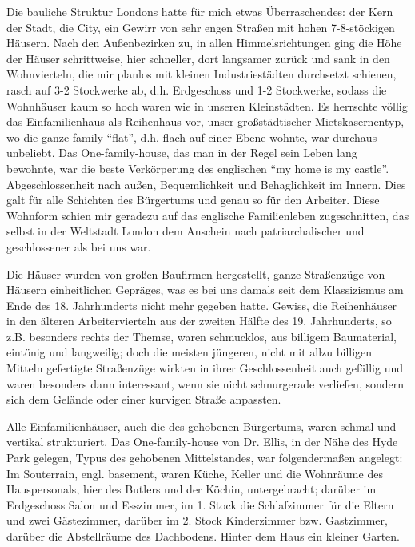 \documentclass[a5paper,pagesize,10pt,twoside=true]{scrbook}
\renewcommand{\marginpar}[2][]{}
\begin{document}
Die bauliche Struktur Londons hatte für mich etwas Überraschendes: der Kern der Stadt, die City, ein Gewirr von sehr engen Straßen mit hohen 7-8-stöckigen Häusern. Nach den Außenbezirken zu, in allen Himmelsrichtungen ging die Höhe der Häuser schrittweise, hier schneller, dort langsamer zurück und sank in den Wohnvierteln, die mir planlos mit kleinen Industriestädten durchsetzt schienen, rasch auf 3-2 Stockwerke ab, d.h. Erdgeschoss und 1-2 Stockwerke, sodass die Wohnhäuser kaum so hoch waren wie in unseren Kleinstädten. Es herrschte völlig das Einfamilienhaus als Reihenhaus vor, unser großstädtischer Mietskasernentyp, wo die ganze family \enquote{flat}, d.h. flach auf einer Ebene wohnte, war durchaus unbeliebt. Das One-family-house, das man in der Regel sein Leben lang bewohnte, war die beste Verkörperung des englischen \enquote{my home is my castle}. Abgeschlossenheit nach außen, Bequemlichkeit und Behaglichkeit im Innern. Dies galt für alle Schichten des Bürgertums und genau so für den Arbeiter. Diese Wohnform schien mir geradezu auf das englische Familienleben zugeschnitten, das selbst in der Weltstadt London dem Anschein nach patriarchalischer und geschlossener als bei uns war.

Die Häuser wurden von großen Baufirmen hergestellt, ganze Straßenzüge von Häusern einheitlichen Gepräges, was es bei uns damals seit dem Klassizismus am Ende des 18. Jahrhunderts nicht mehr gegeben hatte. Gewiss, die Reihenhäuser in den älteren Arbeitervierteln aus der zweiten Hälfte des 19. Jahrhunderts, so z.B. besonders rechts der Themse, waren schmucklos, aus billigem Baumaterial, eintönig und langweilig; doch die meisten jüngeren, nicht mit allzu billigen Mitteln gefertigte Straßenzüge wirkten in ihrer Geschlossenheit auch gefällig und waren besonders dann interessant, wenn sie nicht schnurgerade verliefen, sondern sich dem Gelände oder einer kurvigen Straße anpassten.

\marginpar{511}
Alle Einfamilienhäuser, auch die des gehobenen Bürgertums, waren schmal und vertikal strukturiert. Das One-family-house von Dr. Ellis, in der Nähe des Hyde Park gelegen, Typus des gehobenen Mittelstandes, war folgendermaßen angelegt: Im Souterrain, engl. basement, waren Küche, Keller und die Wohnräume des Hauspersonals, hier des Butlers und der Köchin, untergebracht; darüber im Erdgeschoss Salon und Esszimmer, im 1. Stock die Schlafzimmer für die Eltern und zwei Gästezimmer, darüber im 2. Stock Kinderzimmer bzw. Gastzimmer, darüber die Abstellräume des Dachbodens. Hinter dem Haus ein kleiner Garten.
\end{document}
